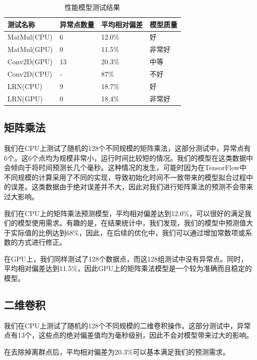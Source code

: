     \begin{table}[!htbp]
        \centering
	    \caption{性能模型测试结果}
        \label{tab:model}
        \begin{tabular}{|l|l|l|l|}
            \hline
            测试名称 & 异常点数量 & 平均相对偏差 & 模型质量 \\
            \hline
            MatMul(CPU) & 6 & 12.0\% & 好 \\
            \hline
            MatMul(GPU) & 0 & 11.5\% & 非常好 \\
            \hline
            Conv2D(GPU) & 13 & 20.3\% & 中等 \\
            \hline
            Conv2D(CPU) & - & 87\% & 不好 \\
            \hline
            LRN(CPU) & 9 & 18.7\% & 好 \\
            \hline
            LRN(GPU) & 0 & 18.4\% & 非常好 \\
            \hline
        \end{tabular}
    \end{table}

\subsection{矩阵乘法}
    我们在CPU上测试了随机的128个不同规模的矩阵乘法，这部分测试中，异常点有6个。这6个点均为规模非常小，运行时间比较短的情况。我们的模型在这类数据中会倾向于将时间预测长几个毫秒。这种情况的发生，可能时因为在TensorFlow中不同规模的计算采用了不同的实现，导致初始化时间不一致带来的模型拟合过程中的误差。这类数据由于绝对误差并不大，因此对我们进行矩阵乘法的预测不会带来过大影响。
    
    我们在CPU上的矩阵乘法预测模型，平均相对偏差达到12.0\%，可以很好的满足我们的模型使用需求。有趣的是，在结果统计中，我们发现，我们的模型中预测值大于实际值的比例达到68\%，因此，在后续的优化中，我们可以通过增加常数项或系数的方式进行修正。

    在GPU上，我们同样测试了128个数据点，而这128组测试中没有异常点。同时，平均相对偏差达到11.5\%，因此GPU上的矩阵乘法模型是一个较为准确而且稳定的模型。

\subsection{二维卷积}
    我们在CPU上测试了随机的128个不同规模的二维卷积操作。这部分测试中，异常点有13个，这些点的绝对偏差值均为毫秒级别，因此不会对模型带来过大的影响。
    
    在去除掉离群点后，平均相对偏差为20.3\%可以基本满足我们的预测需求。

